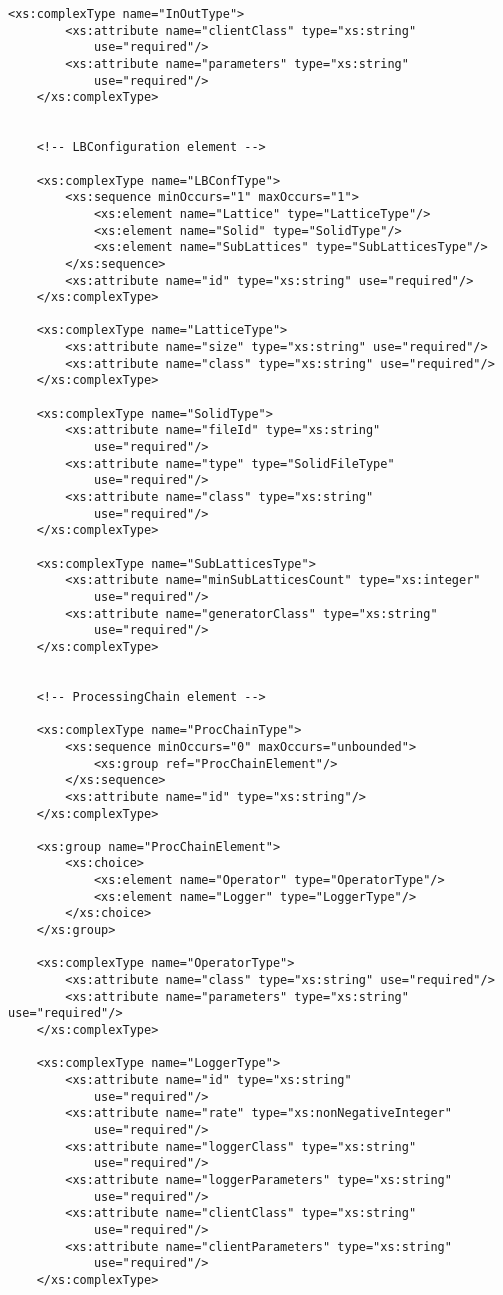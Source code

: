 \begin{Verbatim}[tabsize=2,frame=lines]
	<xs:complexType name="InOutType">
		<xs:attribute name="clientClass" type="xs:string"
			use="required"/>
		<xs:attribute name="parameters" type="xs:string"
			use="required"/>
	</xs:complexType>
	
	
	<!-- LBConfiguration element -->
	
	<xs:complexType name="LBConfType">
		<xs:sequence minOccurs="1" maxOccurs="1">
			<xs:element name="Lattice" type="LatticeType"/>
			<xs:element name="Solid" type="SolidType"/>
			<xs:element name="SubLattices" type="SubLatticesType"/>
		</xs:sequence>
		<xs:attribute name="id" type="xs:string" use="required"/>
	</xs:complexType>
	
	<xs:complexType name="LatticeType">
		<xs:attribute name="size" type="xs:string" use="required"/>
		<xs:attribute name="class" type="xs:string" use="required"/>
	</xs:complexType>
	
	<xs:complexType name="SolidType">
		<xs:attribute name="fileId" type="xs:string"
			use="required"/>
		<xs:attribute name="type" type="SolidFileType"
			use="required"/>
		<xs:attribute name="class" type="xs:string"
			use="required"/>
	</xs:complexType>
	
	<xs:complexType name="SubLatticesType">
		<xs:attribute name="minSubLatticesCount" type="xs:integer"
			use="required"/>
		<xs:attribute name="generatorClass" type="xs:string"
			use="required"/>
	</xs:complexType>
	
	
	<!-- ProcessingChain element -->
	
	<xs:complexType name="ProcChainType">
		<xs:sequence minOccurs="0" maxOccurs="unbounded">
			<xs:group ref="ProcChainElement"/>
		</xs:sequence>
		<xs:attribute name="id" type="xs:string"/>
	</xs:complexType>
	
	<xs:group name="ProcChainElement">
		<xs:choice>
			<xs:element name="Operator" type="OperatorType"/>
			<xs:element name="Logger" type="LoggerType"/>
		</xs:choice>
	</xs:group>
	
	<xs:complexType name="OperatorType">
		<xs:attribute name="class" type="xs:string" use="required"/>
		<xs:attribute name="parameters" type="xs:string" use="required"/>
	</xs:complexType>
	
	<xs:complexType name="LoggerType">
		<xs:attribute name="id" type="xs:string"
			use="required"/>
		<xs:attribute name="rate" type="xs:nonNegativeInteger"
			use="required"/>
		<xs:attribute name="loggerClass" type="xs:string"
			use="required"/>
		<xs:attribute name="loggerParameters" type="xs:string"
			use="required"/>
		<xs:attribute name="clientClass" type="xs:string"
			use="required"/>
		<xs:attribute name="clientParameters" type="xs:string"
			use="required"/>
	</xs:complexType>
	

\end{Verbatim}
